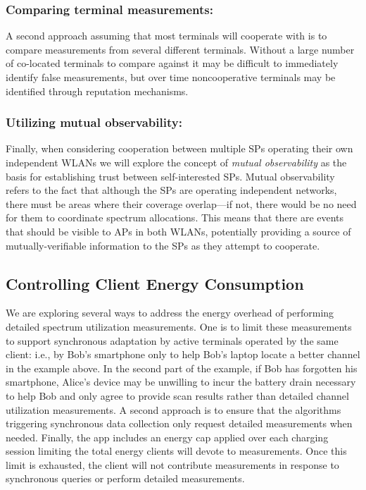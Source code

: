\subsubsection{Comparing terminal measurements:\space} A second approach
assuming that most terminals will cooperate with \PS{} is to compare
measurements from several different terminals. Without a large number of
co-located terminals to compare against it may be difficult to immediately
identify false measurements, but over time noncooperative terminals may be
identified through reputation mechanisms.

\subsubsection{Utilizing mutual observability:\space} Finally, when
considering cooperation between multiple SPs operating their own independent
WLANs we will explore the concept of \textit{mutual observability} as the
basis for establishing trust between self-interested SPs. Mutual
observability refers to the fact that although the SPs are operating
independent networks, there must be areas where their coverage overlap---if
not, there would be no need for them to coordinate spectrum allocations. This
means that there are events that should be visible to APs in both WLANs,
potentially providing a source of mutually-verifiable information to the SPs
as they attempt to cooperate.

\subsection{Controlling Client Energy Consumption}
\label{subsec-energy}

We are exploring several ways to address the energy overhead of performing
detailed spectrum utilization measurements. One is to limit these
measurements to support synchronous adaptation by active terminals operated
by the same client: i.e., by Bob's smartphone only to help Bob's laptop
locate a better channel in the example above. In the second part of the
example, if Bob has forgotten his smartphone, Alice's device may be unwilling
to incur the battery drain necessary to help Bob and only agree to provide
scan results rather than detailed channel utilization measurements. A second
approach is to ensure that the algorithms triggering synchronous data
collection only request detailed measurements when needed. Finally, the
\PS{} app includes an energy cap applied over each charging session
limiting the total energy clients will devote to \PS{} measurements.
Once this limit is exhausted, the client will not contribute measurements in
response to synchronous queries or perform detailed measurements.

